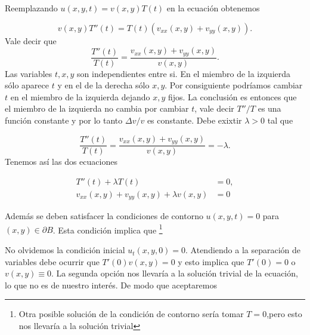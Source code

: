 Reemplazando $u(x,y,t)=v(x,y)T(t)$ en la ecuación obtenemos

\begin{equation}\label{eq:sep_var}v(x,y)T''(t)=T(t)\left(v_{xx}(x,y)+v_{yy}(x,y) \right).
\end{equation}
Vale decir que
\[\frac{T''(t)}{T(t) }=\frac{v_{xx}(x,y)+v_{yy}(x,y)}{v(x,y)}.\]
Las variables $t,x,y$ son independientes entre si.  En el miembro de la izquierda sólo aparece $t$ y en el de la derecha sólo $x,y$.  Por consiguiente  podríamos cambiar $t$ en el miembro de la izquierda dejando $x,y$ fijos. La conclusión es entonces que el miembro de la izquierda no cambia por cambiar $t$, vale decir $T''/T$ es una función constante y por lo tanto $\Delta v/v$ es constante. Debe exixtir $\lambda>0$ tal que
 
 \[\frac{T''(t)}{T(t) }=\frac{v_{xx}(x,y)+v_{yy}(x,y)}{v(x,y)}=-\lambda.\]
Tenemos así las dos ecuaciones

\begin{align}
  T''(t)+\lambda T(t)&=0,\label{eq:eq_t}\\
  v_{xx}(x,y)+v_{yy}(x,y)+\lambda v(x,y)&=0\label{eq:eq_xy}
\end{align}



Además se deben satisfacer la condiciones de contorno  $u(x,y,t)=0$ para  $(x,y)\in \partial B$. Esta condición implica que \footnote{Otra posible solución de la condición de contorno sería tomar  $T=0$,pero esto  nos llevaría a la solución trivial}

No olvidemos  la condición inicial $u_t(x,y,0)=0$. Atendiendo a la separación de variables debe ocurrir que $T'(0)v(x,y)=0$ y esto implica que  $T'(0)=0$ o $v(x,y)\equiv 0$. La segunda opción nos llevaría a  la solución trivial de la ecuación, lo que no es de nuestro interés. De modo que aceptaremos


